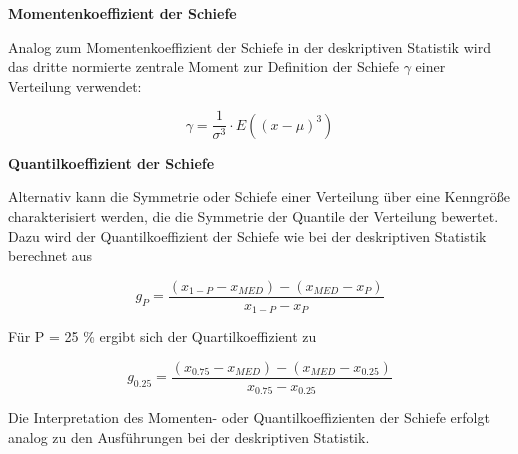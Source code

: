 {\selectfont
\noindent\textbf{Momentenkoeffizient der Schiefe}}\smallskip

\noindent Analog zum Momentenkoeffizient der Schiefe in der deskriptiven Statistik wird das dritte normierte zentrale Moment zur Definition der Schiefe $\gamma$ einer Verteilung verwendet: 

\begin{equation}\label{eq:foursixtyseven}
\gamma =\dfrac{1}{\sigma ^{3}} \cdot E\left((x-\mu)^{3} \right)
\end{equation}

{\selectfont
\noindent\textbf{Quantilkoeffizient der Schiefe}}\smallskip

\noindent Alternativ kann die Symmetrie oder Schiefe einer Verteilung \"{u}ber eine Kenngr\"{o}{\ss}e charakterisiert werden, die die Symmetrie der Quantile der Verteilung bewertet. Dazu wird der Quantilkoeffizient der Schiefe wie bei der deskriptiven Statistik berechnet aus

\begin{equation}\label{eq:foursixtyeight}
g_{P} =\dfrac{(x_{1-P} -x_{MED})-\left(x_{MED} -x_{P} \right)}{x_{1-P} -x_{P}}
\end{equation}

\noindent F\"{u}r P = 25 \% ergibt sich der Quartilkoeffizient zu

\begin{equation}\label{eq:foursixtynine}
g_{0.25} =\dfrac{\left(x_{0.75} -x_{MED} \right)-\left(x_{MED} -x_{0.25} \right)}{x_{0.75} -x_{0.25} }
\end{equation}

\noindent Die Interpretation des Momenten- oder Quantilkoeffizienten der Schiefe erfolgt analog zu den Ausf\"{u}hrungen bei der deskriptiven Statistik.

